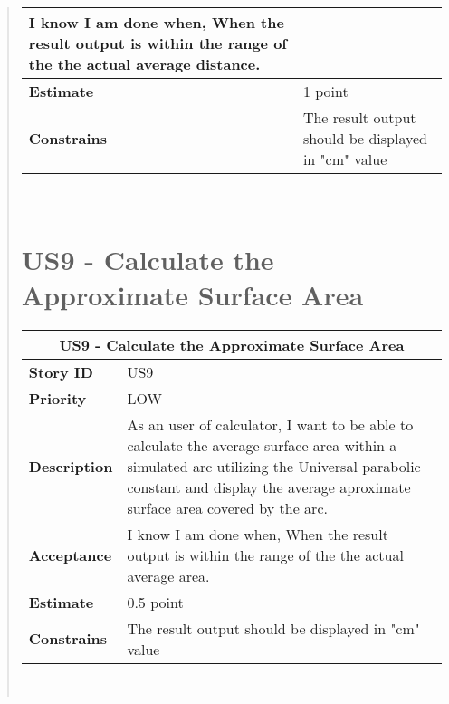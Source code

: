 \documentclass[12pt]{report}
\begin{document}
\begin{quote}
\begin{tabular}{ |p{4cm}|p{10cm}| }
                 I know I am done when,  When the result output is within the range of the the actual average distance. \\
                 \hline
                 \textbf{Estimate} &  1  point  \\
                 \hline
                 \textbf{Constrains}& The result output should be displayed in "cm" value  \\
                 \hline
                \end{tabular}
            \hfill\break\\
            
            
            
               \section{US9 - Calculate the Approximate Surface Area}
                \begin{tabular}{ |p{4cm}|p{10cm}| }
                 \hline
                 \multicolumn{2}{|c|}{\textbf{US9 - Calculate the Approximate Surface Area} } \\
                 \hline
                 \textbf {Story ID}& US9  \\
                 \hline
                 \textbf{Priority} & LOW \\
                 \hline
                 \textbf{Description}   & As an user of calculator, I want to be able to calculate the average surface area within a simulated arc utilizing the Universal parabolic constant and display the average aproximate surface area covered by the arc. \\
                 \hline
                 \textbf{Acceptance}& 
                
                 I know I am done when,  When the result output is within the range of the the actual average area. \\
                 \hline
                 \textbf{Estimate} &  0.5  point  \\
                 \hline
                 \textbf{Constrains}& The result output should be displayed in "cm" value  \\
                 \hline
                \end{tabular}
            \hfill\break\\
             
        
        
            
        \end{quote}
     
\end{document}
